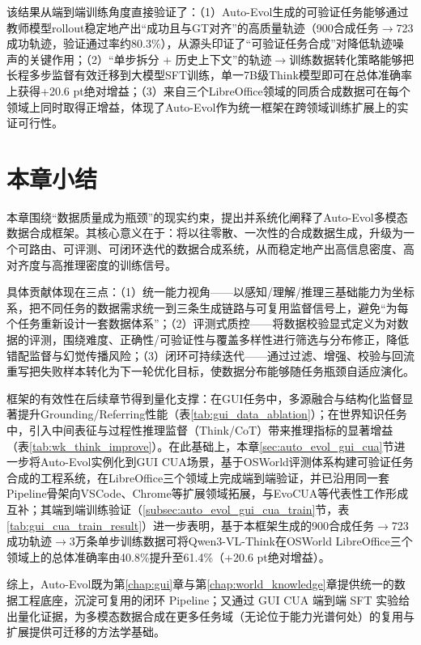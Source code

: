 该结果从端到端训练角度直接验证了：（1）Auto-Evol生成的可验证任务能够通过教师模型rollout稳定地产出“成功且与GT对齐”的高质量轨迹（900合成任务$\rightarrow$723成功轨迹，验证通过率约80.3\%），从源头印证了“可验证任务合成”对降低轨迹噪声的关键作用；（2）“单步拆分 + 历史上下文”的轨迹$\rightarrow$训练数据转化策略能够把长程多步监督有效迁移到大模型SFT训练，单一7B级Think模型即可在总体准确率上获得+20.6 pt绝对增益；（3）来自三个LibreOffice领域的同质合成数据可在每个领域上同时取得正增益，体现了Auto-Evol作为统一框架在跨领域训练扩展上的实证可行性。

\section{本章小结}
本章围绕“数据质量成为瓶颈”的现实约束，提出并系统化阐释了Auto-Evol多模态数据合成框架。其核心意义在于：将以往零散、一次性的合成数据生成，升级为一个可路由、可评测、可闭环迭代的数据合成系统，从而稳定地产出高信息密度、高对齐度与高推理密度的训练信号。

具体贡献体现在三点：（1）统一能力视角——以感知/理解/推理三基础能力为坐标系，把不同任务的数据需求统一到三条生成链路与可复用监督信号上，避免“为每个任务重新设计一套数据体系”；（2）评测式质控——将数据校验显式定义为对数据的评测，围绕难度、正确性/可验证性与覆盖多样性进行筛选与分布修正，降低错配监督与幻觉传播风险；（3）闭环可持续迭代——通过过滤、增强、校验与回流重写把失败样本转化为下一轮优化目标，使数据分布能够随任务瓶颈自适应演化。

框架的有效性在后续章节得到量化支撑：在GUI任务中，多源融合与结构化监督显著提升Grounding/\allowbreak Referring性能（表\ref{tab:gui_data_ablation}）；在世界知识任务中，引入中间表征与过程性推理监督（Think/CoT）带来推理指标的显著增益（表\ref{tab:wk_think_improve}）。在此基础上，本章\ref{sec:auto_evol_gui_cua}节进一步将Auto-Evol实例化到GUI CUA场景，基于OSWorld评测体系\citep{xie2024osworld}构建可验证任务合成的工程系统，在LibreOffice三个领域上完成端到端验证，并已沿用同一套Pipeline骨架向VSCode、Chrome等扩展领域拓展，与EvoCUA\citep{xue2026evocua}等代表性工作形成互补；其端到端训练验证（\ref{subsec:auto_evol_gui_cua_train}节，表\ref{tab:gui_cua_train_result}）进一步表明，基于本框架生成的900合成任务$\rightarrow$723成功轨迹$\rightarrow$3万条单步训练数据可将Qwen3-VL-Think在OSWorld LibreOffice三个领域上的总体准确率由40.8\%提升至61.4\%（+20.6 pt绝对增益）。

综上，Auto-Evol既为第\ref{chap:gui}章与第\ref{chap:world_knowledge}章提供统一的数据工程底座，沉淀可复用的闭环 Pipeline；又通过 GUI CUA 端到端 SFT 实验给出量化证据，为多模态数据合成在更多任务域（无论位于能力光谱何处）的复用与扩展提供可迁移的方法学基础。

